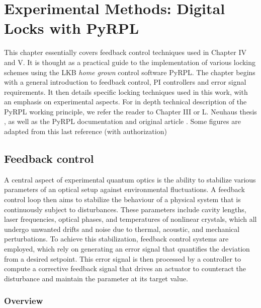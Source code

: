 \chapter{Experimental Methods: Digital Locks with PyRPL} \label{chap:locks}
This chapter essentially covers feedback control techniques used in Chapter IV and V. It is thought as a practical guide to the implementation of various locking schemes using the LKB \textit{home grown} control software PyRPL. The chapter begins with a general introduction to feedback control, PI controllers and error signal requirements. It then details specific locking techniques used in this work, with an emphasis on experimental aspects. For in depth technical description of the PyRPL working principle, we refer the reader to Chapter III or L. Neuhaus thesis \cite{neuhaus}, as well as the PyRPL documentation \cite{PyRPLDocs} and original article \cite{PyRPL2024}. Some figures are adapted from this last reference (with authorization)
\minitoc
\newpage
\section{Feedback control}
A central aspect of experimental quantum optics is the ability to stabilize various parameters of an optical setup against environmental fluctuations. A feedback control loop then aims to stabilize the behaviour of a physical system that is continuously subject to disturbances. These parameters include cavity lengths, laser frequencies, optical phases, and temperatures of nonlinear crystals, which all undergo unwanted drifts and noise due to thermal, acoustic, and mechanical perturbations. To achieve this stabilization, feedback control systems are employed, which rely on generating an error signal that quantifies the deviation from a desired setpoint. This error signal is then processed by a controller to compute a corrective feedback signal that drives an actuator to counteract the disturbance and maintain the parameter at its target value.

\subsection{Overview}

